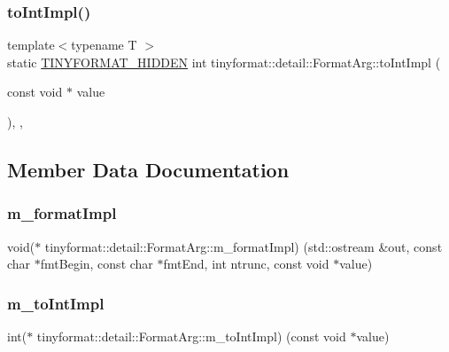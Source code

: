 \subsubsection{\texorpdfstring{to\+Int\+Impl()}{toIntImpl()}}
{\footnotesize\ttfamily template$<$typename T $>$ \\
static \mbox{\hyperlink{tinyformat_8h_a2c0b8573a0f2148232e2ecfe7afa6ca8}{T\+I\+N\+Y\+F\+O\+R\+M\+A\+T\+\_\+\+H\+I\+D\+D\+EN}} int tinyformat\+::detail\+::\+Format\+Arg\+::to\+Int\+Impl (\begin{DoxyParamCaption}\item[{const void $\ast$}]{value }\end{DoxyParamCaption})\hspace{0.3cm}{\ttfamily [inline]}, {\ttfamily [static]}, {\ttfamily [private]}}



\subsection{Member Data Documentation}
\mbox{\label{classtinyformat_1_1detail_1_1_format_arg_a3e1114e7a277020906bfd4588ff9b6fc}} 
\subsubsection{\texorpdfstring{m\+\_\+format\+Impl}{m\_formatImpl}}
{\footnotesize\ttfamily void($\ast$ tinyformat\+::detail\+::\+Format\+Arg\+::m\+\_\+format\+Impl) (std\+::ostream \&out, const char $\ast$fmt\+Begin, const char $\ast$fmt\+End, int ntrunc, const void $\ast$value)\hspace{0.3cm}{\ttfamily [private]}}

\mbox{\label{classtinyformat_1_1detail_1_1_format_arg_a999e592d6235d5dbdf0f46cad769f220}} 
\subsubsection{\texorpdfstring{m\+\_\+to\+Int\+Impl}{m\_toIntImpl}}
{\footnotesize\ttfamily int($\ast$ tinyformat\+::detail\+::\+Format\+Arg\+::m\+\_\+to\+Int\+Impl) (const void $\ast$value)\hspace{0.3cm}{\ttfamily [private]}}

